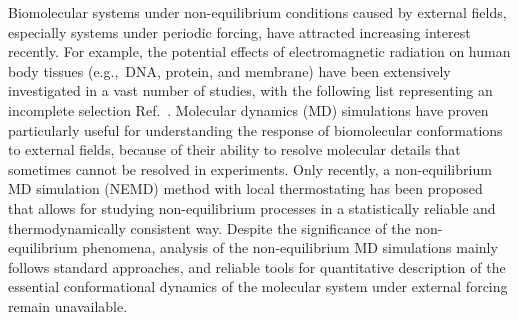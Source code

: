\documentclass[journal=jctcce,manuscript=article]{achemso}
\begin{document}
Biomolecular systems under non-equilibrium conditions caused by external fields, especially
systems under periodic forcing, have attracted increasing
interest recently.  For example, the potential effects of electromagnetic
radiation on  human body tissues (e.g.,~DNA, protein, and membrane)  have been extensively
investigated in a vast number of studies, with the following list  representing an incomplete selection Ref.~\cite{bohr2000microwave, bohr2000microwave-1, dePomerai2000cell,
  dePomerai2003microwave, mancinelli2004non, inskip2001cellular, bekard2013electric, budi2005electric,
  budi2007effect, budi2008comparative, astrakas2012structural,
  damm2012can, english2009nonequilibrium, solomentsev2012effects}.  Molecular dynamics (MD) simulations have proven particularly useful for understanding
the response of biomolecular conformations to external fields, because of their ability to  resolve molecular
details that sometimes cannot be resolved in experiments. Only
recently, a non-equilibrium MD simulation (NEMD) method with local thermostating has been proposed~\cite{wang2014exploring} that allows for studying 
non-equilibrium processes in a statistically reliable and thermodynamically consistent way. 
Despite the significance of the non-equilibrium phenomena, 
analysis of the non-equilibrium MD simulations mainly follows standard approaches, and reliable tools for quantitative description of
the essential conformational dynamics of the molecular system under external forcing remain unavailable. 

\end{document}

